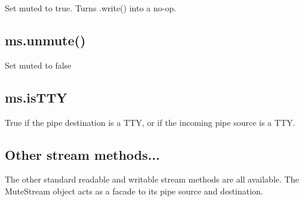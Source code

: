 Set {\ttfamily muted} to {\ttfamily true}. Turns {\ttfamily .write()} into a no-\/op.

\subsection*{ms.\+unmute()}

Set {\ttfamily muted} to {\ttfamily false}

\subsection*{ms.\+is\+T\+TY}

True if the pipe destination is a T\+TY, or if the incoming pipe source is a T\+TY.

\subsection*{Other stream methods...}

The other standard readable and writable stream methods are all available. The Mute\+Stream object acts as a facade to its pipe source and destination. 